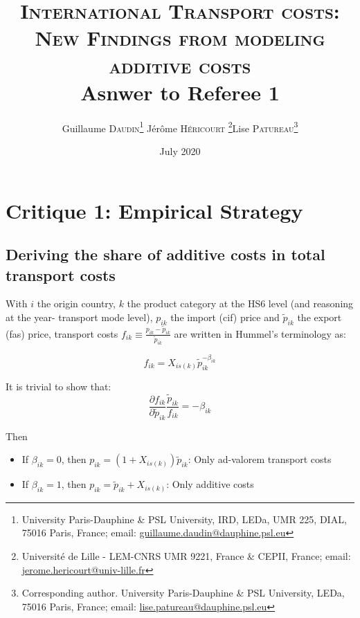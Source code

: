 \documentclass[a4paper,12pt]{article}
\begin{document}
\title{\textsc{International Transport costs:\\New Findings from modeling additive costs} \\
Asnwer to Referee 1}

\author{Guillaume \textsc{Daudin}\thanks{%
University Paris-Dauphine \& PSL University, IRD, LEDa, UMR 225, DIAL, 75016 Paris, France; email: \url{guillaume.daudin@dauphine.psl.eu}}  \qquad J\'{e}r\^{o}me \textsc{H\'{e}ricourt} \thanks{Universit\'{e} de Lille - LEM-CNRS UMR 9221, France \& CEPII, France; email: \url{jerome.hericourt@univ-lille.fr}}\qquad Lise \textsc{Patureau}\thanks{Corresponding author.
University Paris-Dauphine \& PSL University, LEDa, 75016 Paris, France;  email: \url{lise.patureau@dauphine.psl.eu} } }


\date{July 2020}
 \maketitle
\bigskip

\section{Critique 1: Empirical Strategy}

\subsection{Deriving the share of additive costs in total transport costs \label{ssec:interpret_beta}}
With $i$ the origin country, $k$ the product category at the HS6 level (and reasoning at the year- transport mode level), $p_{ik}$ the import (cif) price and $\tilde{p}_{ik}$ the export (fas) price, transport costs $f_{ik}\equiv \frac{p_{ik}- \tilde{p}_{ik}}{\tilde{p}_{ik}} $ are written in Hummel's terminology as:


\begin{equation}
f_{ik} = X_{is(k)}\tilde{p}_{ik}^{-\beta_{ik}} \label{eq:Hummels}
\end{equation}

It is trivial to show that:
$$\frac{\partial f_{ik}}{\partial \tilde{p}_{ik}} \frac{\tilde{p}_{ik}}{f_{ik}}= -\beta_{ik}$$

Then
\begin{itemize}
\item If $\beta_{ik} = 0$, then $p_{ik} = (1+X_{is(k)})\tilde{p}_{ik}$: Only ad-valorem transport costs
\item If $\beta_{ik} = 1$, then $p_{ik}=\tilde{p}_{ik}+X_{is(k)}$: Only additive costs
\end{itemize}
\end{document}
